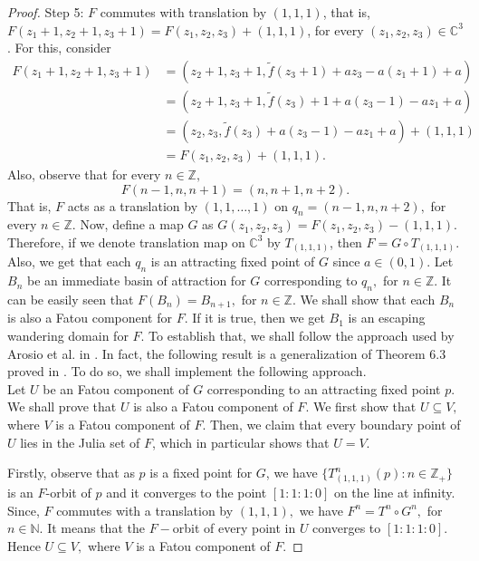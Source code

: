 \documentclass[12pt, reqno]{amsart}
\numberwithin{equation}{section}
\theoremstyle{definition}
\theoremstyle{remark}
\theoremstyle{plain}
\theoremstyle{definition}
\numberwithin{equation}{section}
\begin{document}
\begin{proof}
\noindent Step 5: $F$ commutes with translation by $(1,1,1)$, 
that is, $F(z_1+1,z_2+1, z_3+1)=F(z_1,z_2, z_3)+(1,1,1)$, 
for every $(z_1,z_2, z_3)\in\mathbb{C}^{3}$. 
For this, consider
\begin{align*}
F(z_1+1,z_2+1, z_3+1)& = (z_2+1,z_3+1,\widetilde{f}(z_3+1)+az_3-a(z_1+1)+a)\\
&= (z_2+1,z_3+1,\widetilde{f}(z_3)+1+a(z_3-1)-az_1+a)\\
& = (z_2,z_3,\widetilde{f}(z_3)+a(z_3-1)-az_1+a)+(1,1,1)\\
& = F(z_1,z_2,z_3)+(1,1,1).
\end{align*}
Also, observe that 
for every $n\in\mathbb{Z},$
\[ F(n-1,n,n+1)=(n,n+1,n+2).\] That is, $F$ acts 
as a translation by $(1,1,\dots,1)$ 
on $q_n=(n-1,n, n+2),$ 
for every $n\in\mathbb{Z}$. Now, define a map $G$ as $G(z_1,z_2,z_3)=F(z_1,z_2,z_3)-(1,1,1)$. Therefore, if we denote translation map on $\mathbb{C}^3$ by $T_{(1,1,1)}$, then $F=G\circ T_{(1,1,1)}$. Also, we get that each $q_n$ is an attracting fixed point of $G$ since $a\in (0,1)$. 
Let $B_n$ be an immediate basin of attraction for $G$ corresponding 
to $q_n,$ for $ n\in\mathbb{Z}.$
It can be easily seen  
that $F(B_n) = B_{n+1},$ for $ n\in\mathbb{Z}.$ 
We shall show that 
each $B_n$ is also a Fatou component for $F$. If it is true, then we get $B_1$ is an escaping wandering domain for $F$.
To establish that, 
we shall follow the approach used by Arosio et al. in \cite[Theorem 6.3]{Arosio}. In fact, the following result is a generalization of Theorem $6.3$ proved in \cite{Arosio}.
To do so, we shall implement the following approach.\\
Let $U$ be an Fatou component of $G$ corresponding to an attracting fixed point $p$. We shall prove that  $U$ is also a Fatou component of $F$.  
 We first show that $U\subseteq V,$ where $V$ is 
a Fatou component of $F$. Then, we claim 
that every boundary point of $U$ lies in the 
Julia set of $F$, which in particular shows that $U=V$.

Firstly, observe that as $p$ is a fixed point 
for $G$, we have $\{T^n_{(1,1,1)}(p): n\in\mathbb{Z}_+\}$ 
is an $F$-orbit of $p$ and it converges to the 
point $[1:1:1:0]$ on the line at infinity. 
Since, $F$ commutes with a translation 
by $(1,1,1),$ we have $F^{ n}=T^n\circ G^n,$ for $ n\in\mathbb{N}$. It means that the $F-$orbit 
of every point in $U$ converges to $[1:1:1:0]$. Hence $U\subseteq V,$ where $V$ is a Fatou component of $F$.


\end{proof}
\end{document}
